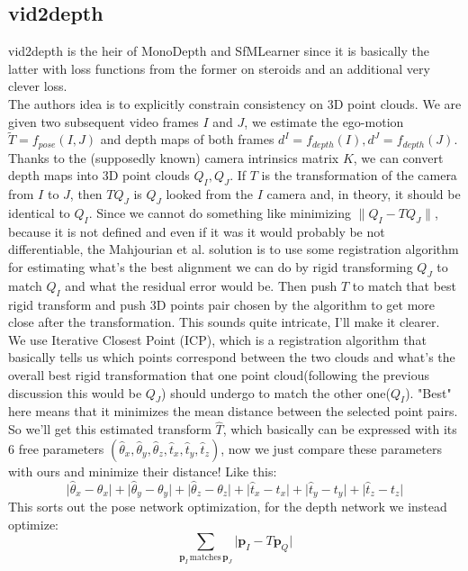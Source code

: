 \subsection{vid2depth}
vid2depth \cite{mahjourian2018unsupervised} is the heir of MonoDepth and SfMLearner since it is basically the latter with loss functions from the former on steroids and an additional very clever loss. \\
The authors idea is to explicitly constrain consistency on 3D point clouds. We are given two subsequent video frames $I$ and $J$, we estimate the ego-motion $\tilde{T} = f_{pose}(I, J)$ and depth maps of both frames $d^{I} = f_{depth}(I), d^{J} = f_{depth}(J)$. Thanks to the (supposedly known) camera intrinsics matrix $K$, we can convert depth maps into 3D point clouds $Q_{I}, Q_{J}$. If $T$ is the transformation of the camera from $I$ to $J$, then $T Q_{J}$ is $Q_{J}$ looked from the $I$ camera and, in theory, it should be identical to $Q_{I}$. Since we cannot do something like minimizing $\big\| Q_{I} - T Q_{J} \big\|$, because it is not defined and even if it was it would probably be not differentiable, the Mahjourian et al. solution is to use some registration algorithm for estimating what's the best alignment we can do by rigid transforming $Q_{J}$ to match $Q_{I}$ and what the residual error would be. Then push $T$ to match that best rigid transform and push 3D points pair chosen by the algorithm to get more close after the transformation. This sounds quite intricate, I'll make it clearer.\\
We use Iterative Closest Point (ICP), which is a registration algorithm that basically tells us which points correspond between the two clouds and what's the overall best rigid transformation that one point cloud(following the previous discussion this would be $Q_{J}$) should undergo to match the other one($Q_{I}$). "Best" here means that it minimizes the mean distance between the selected point pairs. So we'll get this estimated transform $\hat{T}$, which basically can be expressed with its 6 free parameters $(\hat{\theta}_{x}, \hat{\theta}_{y}, \hat{\theta}_{z}, \hat{t}_{x}, \hat{t}_{y}, \hat{t}_{z})$, now we just compare these parameters with ours and minimize their distance! Like this:
\[
	\big| \hat{\theta}_{x} - \theta_{x} \big| +
	\big| \hat{\theta}_{y} - \theta_{y} \big| +
	\big| \hat{\theta}_{z} - \theta_{z} \big| +
	\big| \hat{t}_{x} - t_{x} \big| +
	\big| \hat{t}_{y} - t_{y} \big| +
	\big| \hat{t}_{z} - t_{z} \big|
\]
This sorts out the pose network optimization, for the depth network we instead optimize:
\[
	\sum_{\mathbf{p}_{I} \, \text{matches} \, \mathbf{p}_{J}} \big| \mathbf{p}_{I} - T \mathbf{p}_{Q} \big|
\]

